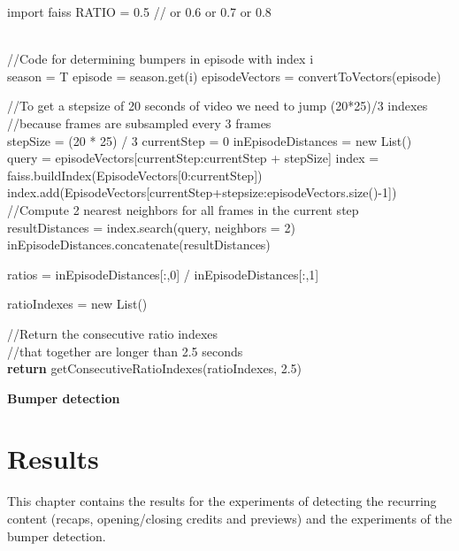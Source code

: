 \documentclass{report}
\begin{document}
\begin{algorithm}[h] 
	\SetAlgoLined
	
	import faiss\;
	RATIO = 0.5 // or 0.6 or 0.7 or 0.8 \\
	\texttt{\\}
	
	//Code for determining bumpers in episode with index i \\
	season = T\;
	episode = season.get(i)\;
	episodeVectors = convertToVectors(episode)\;
	\texttt{\\}
		
	//To get a stepsize of 20 seconds of video we need to jump (20*25)/3 indexes \\
	//because frames are subsampled every 3 frames \\
	stepSize = (20 * 25) / 3 \;
	currentStep = 0\;
	inEpisodeDistances = new List()\;
	{
	\texttt{\\}
	 query = episodeVectors[currentStep:currentStep + stepSize] \;
	 index = faiss.buildIndex(EpisodeVectors[0:currentStep])\;
	 index.add(EpisodeVectors[currentStep+stepsize:episodeVectors.size()-1])\;
	 \texttt{\\}
	 //Compute 2 nearest neighbors for all frames in the current step \\
	 resultDistances = index.search(query, neighbors = 2)\;
	 inEpisodeDistances.concatenate(resultDistances)\;
	}

	ratios = inEpisodeDistances[:,0] / inEpisodeDistances[:,1]\;
	
	ratioIndexes = new List()\;
	
	//Return the consecutive ratio indexes  \\
	//that together are longer than 2.5 seconds \\
	\textbf{return} getConsecutiveRatioIndexes(ratioIndexes, 2.5)\;
	
	\caption{\textbf{Bumper detection}}
	\label{algorithm:bumpers}
\end{algorithm}

\chapter{Results} \label{results}
This chapter contains the results for the experiments of detecting the recurring content (recaps, opening/closing credits and previews) and the experiments of the bumper detection.
\end{document}

